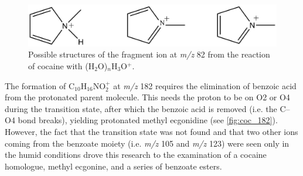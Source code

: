 \begin{figure}[htbp]
\centering
\includegraphics[width=0.6\linewidth]{pics/cocaine-chapter/mz82.png}
\caption{Possible structures of the fragment ion at \textit{m/z} 82 from the reaction of cocaine with (H$_2$O)$_n$H$_3$O$^+$. }
\label{fig:coc_82}
\end{figure}


The formation of C$_{10}$H$_{16}$NO$_2^+$ at \textit{m/z} 182 requires the elimination of benzoic acid from the protonated parent molecule.
%
This needs the proton to be on O2 or O4 during the transition state, after which the benzoic acid is removed (i.e. the C--O4 bond breaks), yielding protonated methyl ecgonidine (see \autoref{fig:coc_182}).
%
However, the fact that the transition state was not found and that two other ions coming from the benzoate moiety (i.e. \textit{m/z} 105 and \textit{m/z} 123) were seen only in the humid conditions drove this research to the examination of a cocaine homologue, methyl ecgonine, and a series of benzoate esters.

%
 







